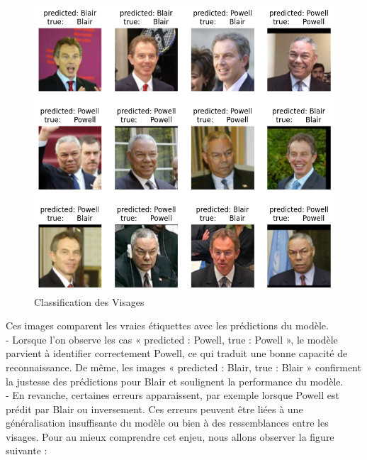 \documentclass[12pt,a4paper]{report}
\begin{document}
\begin{figure}[H]
    \centering
    \includegraphics[width=0.9\linewidth]{images/predvis.png}
    \caption{Classification des Visages}
    \label{fig:placeholder}
\end{figure}
Ces images comparent les vraies étiquettes avec les prédictions du modèle.\\
- Lorsque l’on observe les cas « predicted : Powell, true : Powell », le modèle parvient à identifier correctement Powell, ce qui traduit une bonne capacité de reconnaissance. De même, les images « predicted : Blair, true : Blair » confirment la justesse des prédictions pour Blair et soulignent la performance du modèle.\\
- En revanche, certaines erreurs apparaissent, par exemple lorsque Powell est prédit par Blair ou inversement.
 Ces erreurs peuvent être liées à une généralisation insuffisante du modèle ou bien à des ressemblances entre les visages. Pour au mieux comprendre cet enjeu, nous allons observer la figure suivante :
\end{document}
